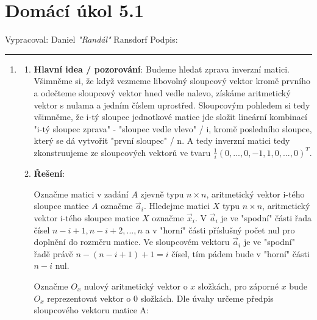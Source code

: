 \documentclass[12pt]{article}
\begin{document}
\section*{Domácí úkol 5.1}

Vypracoval: Daniel \textit{"Randál"} Ransdorf \hfill Podpis: \rule{4cm}{0.4pt}

\begin{enumerate}
  \item
  
    \begin{enumerate}
      \item \textbf{Hlavní idea / pozorování}: Budeme hledat zprava inverzní matici.
        Všimněme si, že když vezmeme libovolný sloupcový vektor kromě prvního a odečteme
        sloupcový vektor hned vedle nalevo, získáme aritmetický vektor s nulama a jedním číslem
        uprostřed.
        Sloupcovým pohledem si tedy všimněme, že i-tý sloupec jednotkové matice jde složit
        lineární kombinací "i-tý sloupec zprava" - "sloupec vedle vlevo" / i, kromě
        posledního sloupce, který se dá vytvořit "první sloupec" / n.
        A tedy inverzní matici tedy zkonstruujeme ze sloupcových vektorů
        ve tvaru $\frac{1}{i}(0,...,0,-1,1,0,...,0)^T$.
        
      \item \textbf{Řešení}:

        Označme matici v zadání $A$ zjevně typu $n \times n$,
        aritmetický vektor i-tého sloupce matice $A$ označme $\vec{a}_i$. Hledejme matici
        $X$ typu $n \times n$, aritmetický vektor i-tého sloupce matice $X$ označme $\vec{x}_i$.
        V $\vec{a}_i$ je ve "spodní" části řada čísel $n-i+1, n-i+2, ..., n$
        a v "horní" části příslušný počet nul pro doplnění do rozměru matice.
        Ve sloupcovém vektoru $\vec{a}_i$ je ve "spodní" řadě právě $n-(n-i+1)+1=i$ čísel, tím pádem bude v "horní" části
        $n-i$ nul.
        
        Označme $O_x$ nulový aritmetický vektor o $x$ složkách, pro záporné $x$ bude $O_x$ reprezentovat vektor o 0 složkách. 
        Dle úvahy určeme předpis sloupcového vektoru matice A:


\end{enumerate}
\end{enumerate}
\end{document}
